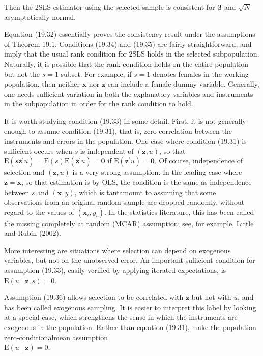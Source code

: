 \documentclass[10pt]{article}
\begin{document}
Then the 2SLS estimator using the selected sample is consistent for $\boldsymbol{\beta}$ and $\sqrt{N}$ asymptotically normal.

Equation (19.32) essentially proves the consistency result under the assumptions of Theorem 19.1. Conditions (19.34) and (19.35) are fairly straightforward, and imply that the usual rank condition for 2SLS holds in the selected subpopulation. Naturally, it is possible that the rank condition holds on the entire population but not the $s=1$ subset. For example, if $s=1$ denotes females in the working population, then neither $\mathbf{x}$ nor $\mathbf{z}$ can include a female dummy variable. Generally, one needs sufficient variation in both the explanatory variables and instruments in the subpopulation in order for the rank condition to hold.

It is worth studying condition (19.33) in some detail. First, it is not generally enough to assume condition (19.31), that is, zero correlation between the instruments and errors in the population. One case where condition (19.31) is sufficient occurs when $s$ is independent of $(\mathbf{z}, u)$, so that $\mathrm{E}\left(s \mathbf{z}^{\prime} u\right)=\mathrm{E}(s) \mathrm{E}\left(\mathbf{z}^{\prime} u\right)=\mathbf{0}$ if $\mathrm{E}\left(\mathbf{z}^{\prime} u\right)=\mathbf{0}$. Of course, independence of selection and $(\mathbf{z}, u)$ is a very strong assumption. In the leading case where $\mathbf{z}=\mathbf{x}$, so that estimation is by OLS, the condition is the same as independence between $s$ and $(\mathbf{x}, y)$, which is tantamount to assuming that some\\
observations from an original random sample are dropped randomly, without regard to the values of $\left(\mathbf{x}_{i}, y_{i}\right)$. In the statistics literature, this has been called the missing completely at random (MCAR) assumption; see, for example, Little and Rubin (2002).

More interesting are situations where selection can depend on exogenous variables, but not on the unobserved error. An important sufficient condition for assumption (19.33), easily verified by applying iterated expectations, is\\
$\mathrm{E}(u \mid \mathbf{z}, s)=0$.

Assumption (19.36) allows selection to be correlated with $\mathbf{z}$ but not with $u$, and has been called exogenous sampling. It is easier to interpret this label by looking at a special case, which strengthens the sense in which the instruments are exogenous in the population. Rather than equation (19.31), make the population zero-conditionalmean assumption\\
$\mathrm{E}(u \mid \mathbf{z})=0$.
\end{document}
